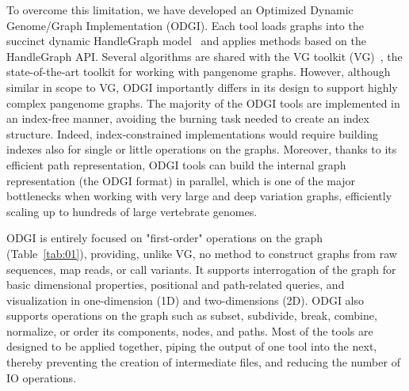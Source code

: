\documentclass{bioinfo}
\begin{document}
    To overcome this limitation, we have developed an Optimized Dynamic Genome/Graph Implementation (ODGI). Each tool
    loads graphs into the succinct dynamic HandleGraph model~\citep{33040146} and applies methods based on the
    HandleGraph API. Several algorithms are shared with the VG toolkit (VG)~\citep{30125266}, the state-of-the-art
    toolkit for working with pangenome graphs. However, although similar in scope to VG, ODGI importantly differs in
    its design to support highly complex pangenome graphs. The majority of the ODGI tools are implemented in an
    index-free manner, avoiding the burning task needed to create an index structure. Indeed, index-constrained
    implementations would require building indexes also for single or little operations on the graphs. Moreover,
    thanks to its efficient path representation, ODGI tools can build the internal graph representation (the ODGI
    format) in parallel, which is one of the major bottlenecks when working with very large and deep variation graphs,
    efficiently scaling up to hundreds of large vertebrate genomes.

    ODGI is entirely focused on "first-order" operations on the graph
    (Table~\ref{tab:01}), providing, unlike VG, no method to construct
    graphs from raw sequences, map reads, or call variants. It
    supports interrogation of the graph for basic dimensional
    properties, positional and path-related queries, and visualization
    in one-dimension (1D) and two-dimensions (2D). ODGI also supports
    operations on the graph such as subset, subdivide, break, combine,
    normalize, or order its components, nodes, and paths. Most of the
    tools are designed to be applied together, piping the output of
    one tool into the next, thereby preventing the creation of
    intermediate files, and reducing the number of IO operations.
\end{document}
